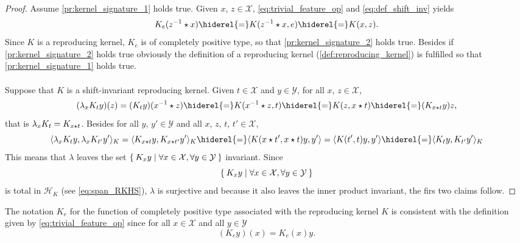 \begin{proof} Assume \cref{pr:kernel_signature_1} holds true. Given $x$, $z\in\mathcal{X}$, \cref{eq:trivial_feature_op} and \cref{eq:def_shift_inv} yields
\begin{dmath*}
K_e(\inv{z}\groupop x)\hiderel{=}K(\inv{z} \groupop x,e)\hiderel{=}K(x,z).
\end{dmath*}
Since $K$ is a reproducing kernel, $K_e$ is of completely positive type, so that \cref{pr:kernel_signature_2} holds true. Besides if \cref{pr:kernel_signature_2} holds true obviously the definition of a reproducing kernel (\cref{def:reproducing_kernel}) is fulfilled so that \cref{pr:kernel_signature_1} holds true.
\paragraph{}
Suppose that $K$ is a shift-invariant reproducing kernel. Given $t\in\mathcal{X}$ and $y\in\mathcal{Y}$, for all $x$, $z\in\mathcal{X}$,
\begin{dmath*}
(\lambda_xK_ty)(z)=(K_ty)(\inv{x}\groupop z)\hiderel{=}K(\inv{x}\groupop z,t)\hiderel{=}K(z,x\groupop t)\hiderel{=}(K_{x\groupop t}y)z,
\end{dmath*}
that is $\lambda_xK_t=K_{x\star t}$. Besides for all $y$, $y'\in\mathcal{Y}$ and all $x$, $z$, $t$, $t'\in\mathcal{X}$,
\begin{dmath*}
\inner{\lambda_xK_ty, \lambda_xK_{t'}y'}_K=\inner{K_{x\groupop t}y, K_{x \groupop t'}y'}_K\hiderel{=}\inner{K(x \groupop t', x \groupop t)y,y'}=\inner{K(t',t)y, y'}\hiderel{=}\inner{K_ty, K_{t'}y'}_K
\end{dmath*}
This means that $\lambda$ leaves the set $\Set{K_xy|\forall x\in\mathcal{X}, \forall y\in\mathcal{Y}}$ invariant.
Since \begin{dmath*}
\Set{K_xy|\forall x\in\mathcal{X}, \forall y\in\mathcal{Y}}
\end{dmath*}
is total in $\mathcal{H}_K$ (see \cref{eq:span_RKHS}), $\lambda$ is surjective and because it also leaves the inner product invariant, the firs two claims follow.
\end{proof}
The notation $K_e$ for the function of completely positive type associated with the reproducing kernel $K$
is consistent with the definition given by \cref{eq:trivial_feature_op} since for all $x\in\mathcal{X}$ and all $y\in\mathcal{Y}$
\begin{dmath*}
(K_ey)(x)=K_e(x)y.
\end{dmath*}

